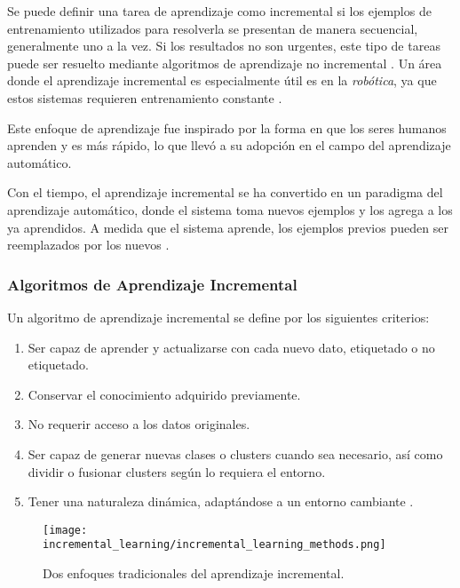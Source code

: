         Se puede definir una tarea de aprendizaje como incremental si los ejemplos de entrenamiento utilizados para resolverla se presentan de manera secuencial, generalmente uno a la vez. Si los resultados no son urgentes, este tipo de tareas puede ser resuelto mediante algoritmos de aprendizaje no incremental \cite{GiraudCarrier2000}. Un área donde el aprendizaje incremental es especialmente útil es en la \textit{robótica}, ya que estos sistemas requieren entrenamiento constante \cite{GiraudCarrier2000}.

        Este enfoque de aprendizaje fue inspirado por la forma en que los seres humanos aprenden y es más rápido, lo que llevó a su adopción en el campo del aprendizaje automático.

        Con el tiempo, el aprendizaje incremental se ha convertido en un paradigma del aprendizaje automático, donde el sistema toma nuevos ejemplos y los agrega a los ya aprendidos. A medida que el sistema aprende, los ejemplos previos pueden ser reemplazados por los nuevos \cite{liu2015}.

        \subsubsection{Algoritmos de Aprendizaje Incremental}

            Un algoritmo de aprendizaje incremental se define por los siguientes criterios:
            \begin{enumerate}
                \item Ser capaz de aprender y actualizarse con cada nuevo dato, etiquetado o no etiquetado.
                \item Conservar el conocimiento adquirido previamente.
                \item No requerir acceso a los datos originales.
                \item Ser capaz de generar nuevas clases o clusters cuando sea necesario, así como dividir o fusionar clusters según lo requiera el entorno.
                \item Tener una naturaleza dinámica, adaptándose a un entorno cambiante \cite{Deshmukh2013}.
            \end{enumerate}

            \begin{figure}[H]
                \centering
                \texttt{[image: incremental\_learning/incremental\_learning\_methods.png]}
                \caption{Dos enfoques tradicionales del aprendizaje incremental.}
                \label{fig:incremental_learning_algorithm}
            \end{figure}

